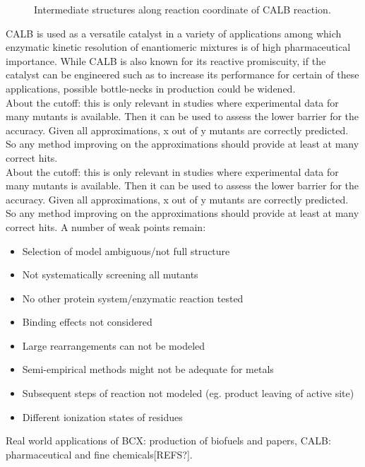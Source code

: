 {\begin{figure}[htbp]
\begin{minipage}{0.55\linewidth}
\end{minipage}
\caption{
Intermediate structures along reaction coordinate of CALB reaction.
}
\label{fig:calb_reaction}
\end{figure}
CALB is used as a versatile catalyst in a variety of applications among which enzymatic kinetic resolution of enantiomeric mixtures is of high pharmaceutical importance\cite{gotor2006candida}.
While CALB is also known for its reactive promiscuity\cite{CBIC:CBIC200800318}, if the catalyst can be engineered such as to increase its performance for certain of these applications, possible bottle-necks in production could be widened.\\
About the cutoff: this is only relevant in studies where experimental data for many mutants is available.
Then it can be used to assess the lower barrier for the accuracy.
Given all approximations, x out of y mutants are correctly predicted.
So any method improving on the approximations should provide at least at many correct hits.\\
About the cutoff: this is only relevant in studies where experimental data for many mutants is available.
Then it can be used to assess the lower barrier for the accuracy.
Given all approximations, x out of y mutants are correctly predicted.
So any method improving on the approximations should provide at least at many correct hits.
A number of weak points remain:
\begin{itemize}
\item Selection of model ambiguous/not full structure
\item Not systematically screening all mutants
\item No other protein system/enzymatic reaction tested
\item Binding effects not considered
\item Large rearrangements can not be modeled
\item Semi-empirical methods might not be adequate for metals
\item Subsequent steps of reaction not modeled (eg. product leaving of active site)
\item Different ionization states of residues
\end{itemize}
}

Real world applications of BCX: production of biofuels and papers, CALB: pharmaceutical and fine chemicals[REFS?].

\newpage
